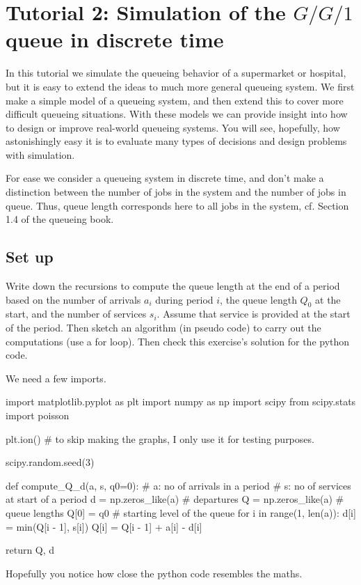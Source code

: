 \section{Tutorial 2: Simulation of the $G/G/1$ queue in discrete time}
\label{sec:single-server-queue}

In this tutorial we simulate the queueing behavior of a supermarket or hospital, but it is easy to extend the ideas to much more general queueing system.
We first make a simple model of a queueing system, and then extend this to cover  more difficult queueing situations.
With these models we can provide insight into how to design or improve real-world queueing systems.
You will see, hopefully, how astonishingly easy it is to evaluate many types of decisions and design problems with simulation.

For ease we  consider a queueing system in discrete time, and don't make a distinction between the number of jobs in the system and the number of jobs in queue. Thus, queue length corresponds here to all jobs in the system, cf. Section 1.4 of the queueing book.

\subsection{Set up}
\label{sec:set-up}


\begin{exercise}
  Write down the recursions to compute the queue length at the end of a period based on the number of arrivals $a_i$ during period $i$, the queue length $Q_0$ at the start, and the number of services $s_i$.
  Assume that service is provided at the start of the period.
  Then sketch an algorithm (in pseudo code) to carry out the computations (use a for loop).
  Then check this exercise's solution for the python code.

\begin{solution}
    We need a few imports.
\begin{pyverbatim}
import matplotlib.pyplot as plt
import numpy as np
import scipy
from scipy.stats import poisson

plt.ion()  # to skip making the graphs, I only use it for testing purposes.

scipy.random.seed(3)


def compute_Q_d(a, s, q0=0):
    # a: no of arrivals in a period
    # s: no of services at start of a period
    d = np.zeros_like(a)  # departures
    Q = np.zeros_like(a)  # queue lengths
    Q[0] = q0  # starting level of the queue
    for i in range(1, len(a)):
        d[i] = min(Q[i - 1], s[i])
        Q[i] = Q[i - 1] + a[i] - d[i]

    return Q, d
\end{pyverbatim}
Hopefully you notice how close the python code resembles the maths.
  \end{solution}

\end{exercise}


